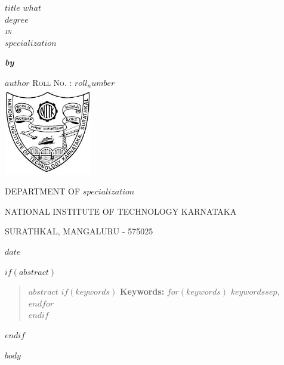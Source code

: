 \documentclass[
    abstract=on,
    a4paper,
    twoside,
    12pt,
]{report}
\begin{document}
\begin{titlepage}
	\doublespacing
	\centering
	{
	    \Huge\bfseries\sffamily
	    $title$
	} 
	\vfill
	{
	\LARGE
	    \textbf{$what$}\\[0.2em]
	}
	\vfill
	{
	\LARGE \scshape
	    $degree$ \\ \textnormal{\textit{in}}\\[0.5em] $specialization$
	}
	\vspace{1em}

	{\large\textbf{\textit{by}}}

	\vspace{1em}
	{
	    \LARGE
	    $author$
	}
	\vfill
	{
	    \Large
	    \scshape
	    Roll No. : $roll_number$\\[1em]
	}
	\vfill
	\includegraphics[width=1.5in]{images/logo}~
	\vfill
	{
	 \Large 
	 \uppercase{Department of $specialization$}
	 
	 \uppercase{National Institute of Technology Karnataka}
	 
	 \uppercase{Surathkal, Mangaluru - 575025} 
	} 
	\vfill
	{\Large $date$}

\end{titlepage}
\thispagestyle{empty}
$if(abstract)$
\begin{abstract}
\small
$abstract$
$if(keywords)$
\vfill
\textbf{Keywords:} $for(keywords)$ $keywords$$sep$, $endfor$ \\
$endif$
\end{abstract}
$endif$

\newpage
{}
\tableofcontents
\listoffigures
\listoftables
\newpage
{}
$body$
\end{document}

